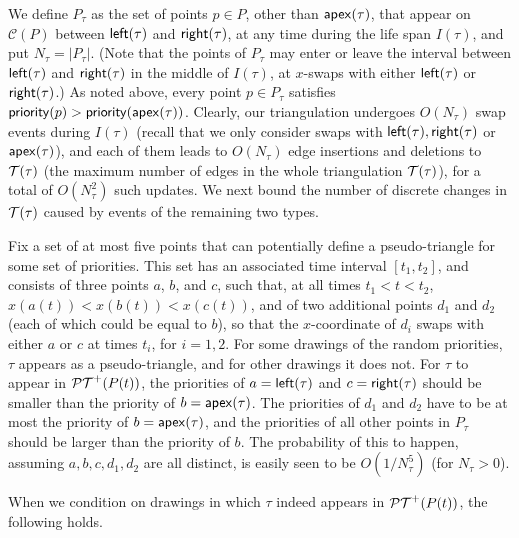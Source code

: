 \documentclass[11pt]{article}
\def\PT{{\cal PT}}
\def\T{{\cal T}}
\def\prior{{\sf priority}}
\def\C{\mathcal{C}}
\def\Left{{\sf left}}
\def\Right{{\sf right}}
\def\apex{{\sf apex}}
\begin{document}
\medskip
\noindent{\bf The number of changes in $\T(\tau)$.}
We define $P_\tau$ as the set of points $p\in P$, other than
$\apex(\tau)$, that appear on $\C(P)$ between $\Left(\tau)$ and
$\Right(\tau)$, at any time during the life span $I(\tau)$, and put
$N_\tau=|P_\tau|$. (Note that the points of $P_\tau$ may enter or leave the interval between $\Left(\tau)$ and $\Right(\tau)$ in the middle of $I(\tau)$, at $x$-swaps with either $\Left(\tau)$ or $\Right(\tau)$.) As noted above, every point $p\in P_\tau$ satisfies
$\prior(p)>\prior(\apex(\tau))$.  Clearly, our triangulation undergoes
$O(N_\tau)$ swap events during $I(\tau)$ (recall that we only consider
swaps with $\Left(\tau),\Right(\tau)$ or $\apex(\tau)$), and each of
them leads to $O(N_\tau)$ edge insertions and deletions to $\T(\tau)$
(the maximum number of edges in the whole triangulation $\T(\tau)$),
for a total of $O(N_\tau^2)$ such updates. We next bound the number of
discrete changes in $\T(\tau)$ caused by events of the remaining two
types.

Fix a set of at most five points that can potentially define a
pseudo-triangle for some set of priorities.  This set has an associated time interval $[t_1,t_2]$, and consists of
three points $a$, $b$, and $c$, such that, at all times $t_1<t<t_2$,
$x(a(t)) < x(b(t)) < x(c(t))$, and of two additional points $d_1$ and
$d_2$ (each of which could be equal to $b$), so that the $x$-coordinate of $d_i$ swaps
with either $a$ or $c$ at times $t_i$, for $i=1,2$. For some drawings of the random priorities, $\tau$ appears as 
a pseudo-triangle, and for other drawings it does not.
For $\tau$ to appear in $\PT^+(P(t))$, the priorities of 
$a=\Left(\tau)$ and
$c=\Right(\tau)$ should be smaller than the priority of 
$b=\apex(\tau)$. The priorities of $d_1$ and $d_2$ have to be at most the priority of $b=\apex(\tau)$,
and the priorities of all other points in  $P_\tau$ should be larger than
the priority of $b$. The probability of this to happen, assuming $a,b,c,d_1,d_2$ are all distinct, is easily seen to be $O(1/N_\tau^5)$ (for $N_\tau>0$).


When we
condition on drawings in which 
 $\tau$ indeed appears in  $\PT^+(P(t))$, the following holds.
\end{document}

